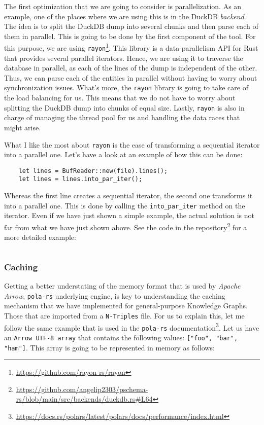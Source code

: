 The first optimization that we are going to consider is parallelization. As an example, one of the places where we are using this is in the DuckDB \textit{backend}. The idea is to split the DuckDB dump into several chunks and then parse each of them in parallel. This is going to be done by the first component of the tool. For this purpose, we are using \texttt{rayon}\footnote{\url{https://github.com/rayon-rs/rayon}}. This library is a data-parallelism API for Rust that provides several parallel iterators. Hence, we are using it to traverse the database in parallel, as each of the lines of the dump is independent of the other. Thus, we can parse each of the entities in parallel without having to worry about synchronization issues. What's more, the \texttt{rayon} library is going to take care of the load balancing for us. This means that we do not have to worry about splitting the DuckDB dump into chunks of equal size. Lastly, \texttt{rayon} is also in charge of managing the thread pool for us and handling the data races that might arise.

What I like the most about \texttt{rayon} is the ease of transforming a sequential iterator into a parallel one. Let's have a look at an example of how this can be done:

\begin{verbatim}
    let lines = BufReader::new(file).lines();
    let lines = lines.into_par_iter();
\end{verbatim}

Whereas the first line creates a sequential iterator, the second one transforms it into a parallel one. This is done by calling the \texttt{into\_par\_iter} method on the iterator. Even if we have just shown a simple example, the actual solution is not far from what we have just shown above. See the code in the repository\footnote{\url{https://github.com/angelip2303/pschema-rs/blob/main/src/backends/duckdb.rs\#L64}} for a more detailed example:

\begin{code}
    \inputminted{rust}{code/listings/11-2_duckdb.rs}
\end{code}

\subsubsection{Caching}

Getting a better understating of the memory format that is used by \textit{Apache Arrow}, \texttt{pola-rs} underlying engine, is key to understanding the caching mechanism that we have implemented for general-purpose Knowledge Graphs. Those that are imported from a \texttt{N-Triples} file. For us to explain this, let me follow the same example that is used in the \texttt{pola-rs} documentation\footnote{\url{https://docs.rs/polars/latest/polars/docs/performance/index.html}}. Let us have an \texttt{Arrow UTF-8 array} that contains the following values: \texttt{["foo", "bar", "ham"]}. This array is going to be represented in memory as follows:

